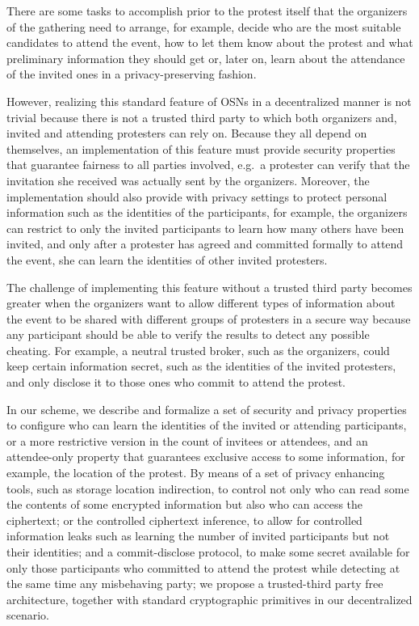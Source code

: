 There are some tasks to accomplish prior to the protest itself that the organizers 
of the gathering need to arrange, for example, decide who are the most suitable 
candidates to attend the event, how to let them know about the protest and what 
preliminary information they should get or, later on, learn about the attendance of 
the invited ones in a privacy-preserving fashion.

However, realizing this standard feature of OSNs in a decentralized manner is not trivial 
because there is not a trusted third party to which both organizers and, invited and 
attending protesters can rely on. Because they all depend on themselves, an 
implementation of this feature must provide security properties that guarantee fairness 
to all parties involved, e.g.\  a protester can verify that the invitation she received 
was actually sent by the organizers. Moreover, the implementation should also provide 
with privacy settings to protect personal information such as the identities of 
the participants, for example, the organizers can restrict to only the invited participants 
to learn how many others have been invited, and only after a protester has agreed 
and committed formally to attend the event, she can learn the identities of other 
invited protesters.

The challenge of implementing this feature without a trusted third party becomes 
greater when the organizers want to allow different types of information about the 
event to be shared with different groups of protesters in a secure way because any 
participant should be able to verify the results to detect any possible cheating. 
For example, a neutral trusted broker, such as the organizers, could keep certain 
information secret, such as the identities of the invited protesters, and only disclose 
it to those ones who commit to attend the protest. 

In our scheme, we describe and formalize a set of security and privacy properties 
to configure who can learn the identities of the invited or attending participants, 
or a more restrictive version in the count of invitees or attendees, and an attendee-only 
property that guarantees exclusive access to some information, for example, the 
location of the protest. By means of a set of privacy enhancing tools, such as storage 
location indirection, to control not only who can read some the contents of some 
encrypted information but also who can access the ciphertext; or the controlled 
ciphertext inference, to allow for controlled information leaks such as learning 
the number of invited participants but not their identities; and a commit-disclose 
protocol, to make some secret available for only those participants who committed 
to attend the protest while detecting at the same time any misbehaving party; we 
propose a trusted-third party free architecture, together with standard cryptographic 
primitives in our decentralized scenario.

